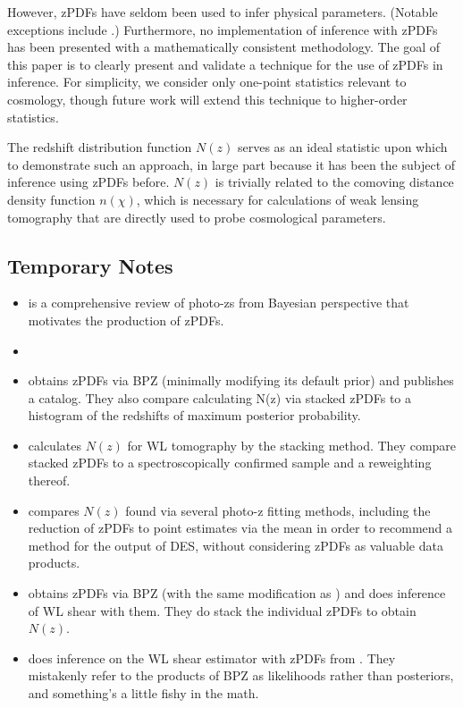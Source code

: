 \documentclass[preprint]{aastex}
\begin{document}
However, zPDFs have seldom been used to infer physical parameters.  (Notable exceptions include \citet{app12}.)  Furthermore, no implementation of inference with zPDFs has been presented with a mathematically consistent methodology.  The goal of this paper is to clearly present and validate a technique for the use of zPDFs in inference.  For simplicity, we consider only one-point statistics relevant to cosmology, though future work will extend this technique to higher-order statistics.

The redshift distribution function $N(z)$ serves as an ideal statistic upon which to demonstrate such an approach, in large part because it has been the subject of inference using zPDFs before.  \citep{she11, kel12, ben12, bon13, vii15}  $N(z)$ is trivially related to the comoving distance density function $n(\chi)$, which is necessary for calculations of weak lensing tomography that are directly used to probe cosmological parameters.  

\subsection*{Temporary Notes}

\begin{itemize}
\item \citet{bud08} is a comprehensive review of photo-zs from Bayesian perspective that motivates the production of zPDFs.
\item \citet{car10} 
\item \citet{hil11} obtains zPDFs via BPZ (minimally modifying its default prior) and publishes a catalog.  They also compare calculating N(z) via stacked zPDFs to a histogram of the redshifts of maximum posterior probability.
\item \citet{ben12} calculates $N(z)$ for WL tomography by the stacking method.  They compare stacked zPDFs to a spectroscopically confirmed sample and a reweighting thereof.
\item \citet{bon15} compares $N(z)$ found via several photo-z fitting methods, including the reduction of zPDFs to point estimates via the mean in order to recommend a method for the output of DES, without considering zPDFs as valuable data products.
\item \citet{kel12} obtains zPDFs via BPZ (with the same modification as \citet{hil11}) and does inference of WL shear with them.  They do stack the individual zPDFs to obtain $N(z)$.
\item \citet{app12} does inference on the WL shear estimator with zPDFs from \citet{kel12}.  They mistakenly refer to the products of BPZ as likelihoods rather than posteriors, and something's a little fishy in the math.
\end{itemize}
\end{document}
